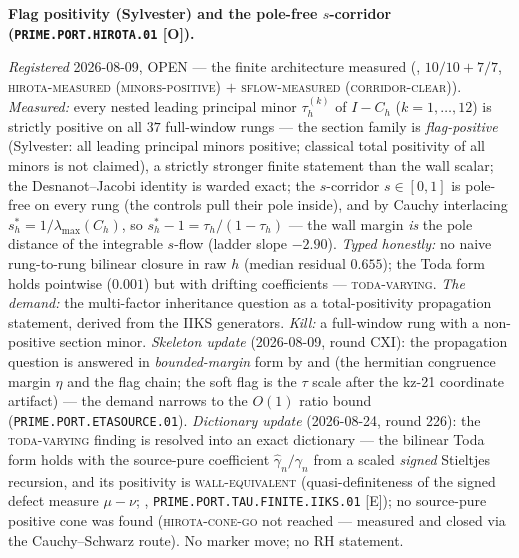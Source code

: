 \par\smallskip\noindent\textbf{Flag positivity (Sylvester) and the
pole-free $s$-corridor
(\texttt{PRIME.PORT.\allowbreak HIROTA.01} [O]).}
{\sloppy
\emph{Registered} 2026-08-09, OPEN --- the finite architecture
measured (, $10/10 +
7/7$, \textsc{hirota-measured (minors-positive)} $+$
\textsc{sflow-measured (corridor-clear)}).  \emph{Measured:}
every nested leading principal minor $\tau^{(k)}_h$ of $I -
C_h$ ($k = 1, \dots, 12$) is strictly positive on all $37$
full-window rungs --- the section family is \emph{flag-positive}
(Sylvester: all leading principal minors positive; classical
total positivity of all minors is not claimed), a strictly
stronger finite statement than the wall
scalar; the Desnanot--Jacobi identity is warded exact; the
$s$-corridor $s \in [0, 1]$ is pole-free on every rung (the
controls pull their pole inside), and by Cauchy interlacing
$s^{*}_h = 1/\lambda_{\max}(C_h)$, so $s^{*}_h - 1 =
\tau_h/(1 - \tau_h)$ --- the wall margin \emph{is} the pole
distance of the integrable $s$-flow (ladder slope $-2.90$).
\emph{Typed honestly:} no naive rung-to-rung bilinear closure
in raw $h$ (median residual $0.655$); the Toda form holds
pointwise ($0.001$) but with drifting coefficients ---
\textsc{toda-varying}.  \emph{The demand:} the multi-factor
inheritance question as a total-positivity propagation
statement, derived from the IIKS generators.  \emph{Kill:} a
full-window rung with a non-positive section minor.
\emph{Skeleton update} (2026-08-09, round CXI): the
propagation question is answered in \emph{bounded-margin} form
by  and
 (the hermitian congruence
margin $\eta$ and the flag chain; the soft flag is the $\tau$
scale after the kz-21 coordinate artifact) --- the demand
narrows to the $O(1)$ ratio bound
(\texttt{PRIME.PORT.ETASOURCE.01}).  \emph{Dictionary update}
(2026-08-24, round 226): the \textsc{toda-varying} finding is
resolved into an exact dictionary --- the bilinear Toda form
holds with the source-pure coefficient $\hat\gamma_n/\gamma_n$
from a scaled \emph{signed} Stieltjes recursion, and its
positivity is \textsc{wall-equivalent} (quasi-definiteness of
the signed defect measure $\mu - \nu$;
,
\texttt{PRIME.PORT.TAU.FINITE.IIKS.01} [E]); no source-pure
positive cone was found (\textsc{hirota-cone-go} not reached
--- measured and closed via the Cauchy--Schwarz route).  No marker
move; no RH statement.\par}


